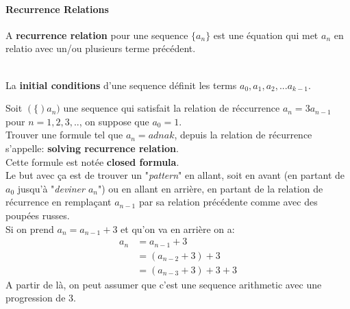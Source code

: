 \paragraph{Recurrence Relations}
\begin{definition}
    A \textbf{recurrence relation} pour une sequence $\{a_n\}$ est une équation qui met $a_n$ en relatio avec un/ou plusieurs terme précédent.
\end{definition}
\\

La \textbf{initial conditions} d'une sequence définit les terms $a_0, a_1, a_2, ...a_{k-1}$.
\\
\begin{exemple}

Soit $(\{)a_n)$ une sequence qui satisfait la relation de réccurrence $a_n = 3a_{n-1}$ pour $n=1, 2, 3, ..$, on suppose que $a_0 = 1$.
\\
Trouver une formule tel que $a_n = adnak$, depuis la relation de récurrence s'appelle: \textbf{solving recurrence relation}.
\\
Cette formule est notée \textbf{closed formula}.
\\
Le but avec ça est de trouver un "\textit{pattern}" en allant, soit en avant (en partant de $a_0$ jusqu'à "\textit{deviner $a_n$}") ou en allant en arrière, en partant de la relation de récurrence en remplaçant $a_{n-1}$ par sa relation précédente comme avec des poupées russes.
\\
Si on prend $a_n = a_{n-1} + 3$ et qu'on va en arrière on a:
\begin{align*}
    a_n &= a_{n-1} + 3 \\
    &= (a_{n-2}+3)+ 3 \\
    &= (a_{n-3}+ 3) + 3 + 3
\end{align*}
A partir de là, on peut assumer que c'est une sequence arithmetic avec une progression de $3$.
\end{exemple}
